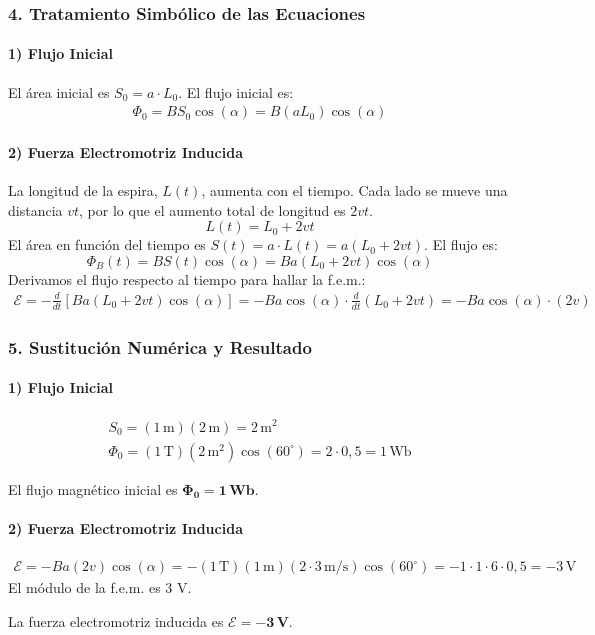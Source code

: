 \subsubsection*{4. Tratamiento Simbólico de las Ecuaciones}
\paragraph{1) Flujo Inicial}
El área inicial es $S_0 = a \cdot L_0$. El flujo inicial es:
\begin{gather}
    \Phi_0 = B S_0 \cos(\alpha) = B (a L_0) \cos(\alpha)
\end{gather}
\paragraph{2) Fuerza Electromotriz Inducida}
La longitud de la espira, $L(t)$, aumenta con el tiempo. Cada lado se mueve una distancia $vt$, por lo que el aumento total de longitud es $2vt$.
$$ L(t) = L_0 + 2vt $$
El área en función del tiempo es $S(t) = a \cdot L(t) = a(L_0+2vt)$. El flujo es:
$$ \Phi_B(t) = B S(t) \cos(\alpha) = B a (L_0+2vt) \cos(\alpha) $$
Derivamos el flujo respecto al tiempo para hallar la f.e.m.:
\begin{gather}
    \mathcal{E} = -\frac{d}{dt} \left[ B a (L_0+2vt) \cos(\alpha) \right] = - B a \cos(\alpha) \cdot \frac{d}{dt}(L_0+2vt) = -B a \cos(\alpha) \cdot (2v)
\end{gather}

\subsubsection*{5. Sustitución Numérica y Resultado}
\paragraph{1) Flujo Inicial}
\begin{gather}
    S_0 = (1\,\text{m})(2\,\text{m}) = 2\,\text{m}^2 \\
    \Phi_0 = (1\,\text{T})(2\,\text{m}^2)\cos(60^\circ) = 2 \cdot 0,5 = 1\,\text{Wb}
\end{gather}
\begin{cajaresultado}
El flujo magnético inicial es $\boldsymbol{\Phi_0 = 1 \, \textbf{Wb}}$.
\end{cajaresultado}
\paragraph{2) Fuerza Electromotriz Inducida}
\begin{gather}
    \mathcal{E} = -B a (2v) \cos(\alpha) = -(1\,\text{T})(1\,\text{m})(2 \cdot 3\,\text{m/s})\cos(60^\circ) = -1 \cdot 1 \cdot 6 \cdot 0,5 = -3\,\text{V}
\end{gather}
El módulo de la f.e.m. es 3 V.
\begin{cajaresultado}
La fuerza electromotriz inducida es $\boldsymbol{\mathcal{E} = -3 \, \textbf{V}}$.
\end{cajaresultado}

